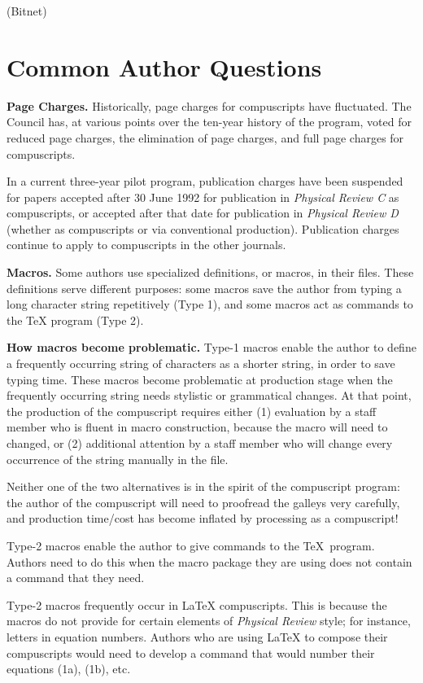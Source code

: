 \leavevmode\phantom{E mail address: }{\tt mis@apsedoff} (Bitnet)


\section{Common Author Questions}
\label{sec:macros}

{\bf Page Charges.}
Historically, page charges for compuscripts have fluctuated. The Council
has, at various points over the ten-year history of the program, voted for
reduced page charges, the elimination of page charges, and full page
charges for compuscripts.

In a current three-year pilot program, publication charges have been
suspended for papers accepted after 30 June 1992 for publication in {\em
Physical Review C\/} as compuscripts, or accepted after that date for
publication in {\em Physical Review D\/} (whether as compuscripts or via
conventional production). Publication charges continue to apply to
compuscripts in the other journals.

\bigskip
{\bf Macros.}
Some authors use specialized definitions, or macros, in their files.  These
definitions serve different purposes:  some macros save the author from
typing a long character string repetitively (Type 1), and  some macros act
as commands to the \TeX{} program (Type 2).

\smallskip
{\bf How macros become problematic.} Type-1 macros enable the author to
define a frequently occurring string of characters as a shorter string, in
order to save typing time. These macros become problematic at production
stage when the frequently occurring string needs stylistic or grammatical
changes. At that point, the production of the compuscript requires either
(1) evaluation by a staff member who is fluent in macro construction,
because the macro will need to changed, or (2) additional attention by a
staff member who will change every occurrence of the string manually in the
file.

Neither one of the two alternatives is in the spirit of the compuscript
program: the author of the compuscript will need to proofread the galleys
very carefully, and production time/cost has become inflated by processing
as a compuscript!

Type-2 macros enable the author to give commands to the \TeX\ program.
Authors need to do this when the macro package they are using does not
contain a command that they need.

Type-2 macros frequently occur in \LaTeX{} compuscripts. This is because
the macros do not provide for certain elements of {\em Physical Review}
style; for instance, letters in equation numbers. Authors who are using
\LaTeX{} to compose their compuscripts would need to develop a command that
would number their equations (1a), (1b), etc.

